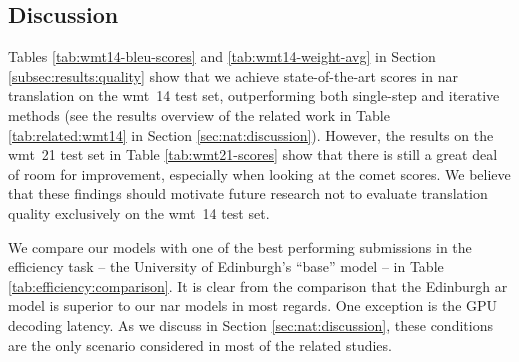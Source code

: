 \subsection{Discussion}%
\label{subsec:results:discussion}

Tables \ref{tab:wmt14-bleu-scores} and \ref{tab:wmt14-weight-avg} in Section
\ref{subsec:results:quality} show that we achieve state-of-the-art scores in
\acl{nar} translation on the \acs{wmt}~14 test set, outperforming both
single-step and iterative methods (see the results overview of the related work
in Table \ref{tab:related:wmt14} in Section \ref{sec:nat:discussion}). However,
the results on the \acs{wmt}~21 test set in Table \ref{tab:wmt21-scores} show
that there is still a great deal of room for improvement, especially when
looking at the \acs{comet} scores. We believe that these findings should
motivate future research not to evaluate translation quality exclusively on the
\acs{wmt}~14 test set.

We compare our models with one of the best performing submissions in the
efficiency task -- the University of Edinburgh's ``base'' model
\citep{Behnke-wmt21-speed} -- in Table \ref{tab:efficiency:comparison}. It is
clear from the comparison that the Edinburgh \acl{ar} model is superior to our
\ac{nar} models in most regards. One exception is the GPU decoding latency. As
we discuss in Section \ref{sec:nat:discussion}, these conditions are the only
scenario considered in most of the related studies.

